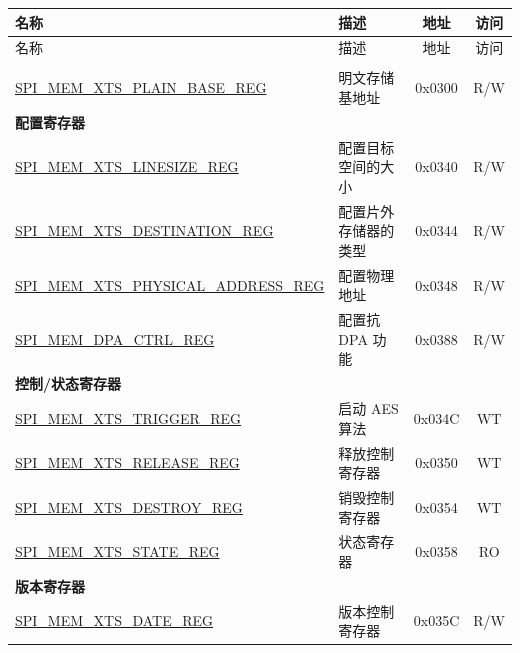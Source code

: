 \begin{longtable}{ | p{6.0cm} | p{6.6cm} | c | c| }
\hline\rowcolor{lightgray}
名称 & 描述 & 地址 & 访问 \\ \hline
\endfirsthead
\hline
\rowcolor{lightgray}
名称 & 描述 & 地址 & 访问  \\
\hline
\endhead
\endfoot

\multicolumn{4}{|l|}{\textbf{明文寄存器堆}} \\\hline
\hyperref[regdesc:SPIMEMXTSPLAINBASEREG]{SPI\_MEM\_XTS\_PLAIN\_BASE\_REG}  & 明文存储基地址   & 0x0300 & R/W \\\hline
\multicolumn{4}{|l|}{\textbf{配置寄存器}} \\ \hline
\hyperref[regdesc:SPIMEMXTSLINESIZEREG]{SPI\_MEM\_XTS\_LINESIZE\_REG}  & 配置目标空间的大小 & 0x0340 & R/W \\\hline
\hyperref[regdesc:SPIMEMXTSDESTINATIONREG]{SPI\_MEM\_XTS\_DESTINATION\_REG}  & 配置片外存储器的类型   & 0x0344 & R/W \\\hline
\hyperref[regdesc:SPIMEMXTSPHYSICALADDRESSREG]{SPI\_MEM\_XTS\_PHYSICAL\_ADDRESS\_REG}  & 配置物理地址   & 0x0348 & R/W \\\hline
\hyperref[regdesc:SPIMEMDPACTRLREG]{SPI\_MEM\_DPA\_CTRL\_REG}  & 配置抗 DPA 功能 & 0x0388 & R/W \\\hline
\multicolumn{4}{|l|}{\textbf{控制/状态寄存器}} \\ \hline
\hyperref[regdesc:SPIMEMXTSTRIGGERREG]{SPI\_MEM\_XTS\_TRIGGER\_REG}  & 启动 AES 算法         & 0x034C & WT \\\hline
\hyperref[regdesc:SPIMEMXTSRELEASEREG]{SPI\_MEM\_XTS\_RELEASE\_REG}  & 释放控制寄存器         & 0x0350 & WT \\\hline
\hyperref[regdesc:SPIMEMXTSDESTROYREG]{SPI\_MEM\_XTS\_DESTROY\_REG}  & 销毁控制寄存器         & 0x0354 & WT \\\hline
\hyperref[regdesc:SPIMEMXTSSTATEREG]{SPI\_MEM\_XTS\_STATE\_REG}  & 状态寄存器       & 0x0358 & RO \\\hline
\multicolumn{4}{|l|}{\textbf{版本寄存器}} \\ \hline
\hyperref[regdesc:SPIMEMXTSDATEREG]{SPI\_MEM\_XTS\_DATE\_REG}  & 版本控制寄存器   & 0x035C & R/W \\\hline

\end{longtable}

